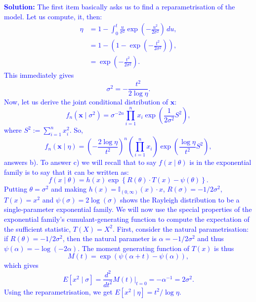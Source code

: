 \documentclass[a4paper,10pt, notitlepage]{report}
\begin{document}
\textcolor{blue}{
\textbf{Solution:}
The first item basically asks us to find a reparametrisation of the model.
Let us compute, it, then:
\begin{align*}
 \eta &= 1 - \int_0^t \frac{u}{\sigma^2} \exp\left(-\frac{u^2}{2\sigma^2}\right)\,du,\\
 &= 1 -\left(1- \exp\left(-\frac{t^2}{2\sigma^2}\right)\right),\\
 &= \exp\left(-\frac{t^2}{2\sigma^2}\right).
\end{align*}
This immediately gives
$$\sigma^2 = -\frac{t^2}{2\log\eta}.$$
Now, let us derive the joint conditional distribution of $\boldsymbol{x}$:
\begin{equation*}
 f_n(\boldsymbol{x} \mid \sigma^2) = \sigma^{-2n}\prod_{i=1}^n x_i \exp\left(\frac{1}{2\sigma^2}S^2\right), 
\end{equation*}
where $S^2 := \sum_{i=1}^n x_i^2$.
So,
\begin{equation}
\label{eq:likelihood_rayleigh}
 f_n(\boldsymbol{x} \mid \eta) = \left(-\frac{2\log\eta}{t^2}\right)^n\left(\prod_{i=1}^n x_i \right) \exp\left(\frac{\log\eta}{t^2}S^2\right),
\end{equation}
answers b).
To answer c) we will recall that to say $f(x\mid\theta)$ is in the exponential family is to say that it can be written as:
\begin{equation*}
 f(x \mid \theta) = h(x) \exp\left\{R(\theta)\cdot T(x) - \psi(\theta) \right\}.
\end{equation*}
Putting $\theta = \sigma^2$ and making $h(x) =  \mathbb{I}_{(0, \infty)}(x) \cdot x $, $R(\sigma) = -1/2\sigma^2$, $T(x) = x^2$ and $\psi(\sigma) = 2\log(\sigma)$ shows the Rayleigh distribution to be a single-parameter exponential family.
We will now use the special properties of the exponential family's cumulant-generating function to compute the expectation of the sufficient statistic, $T(X) = X^2$.
First, consider the natural parametrisation: if $R(\theta) = -1/2\sigma^2$, then the natural parameter is $\alpha = -1/2\sigma^2$ and thus $\psi(\alpha) = -\log(-2\alpha)$.
The moment generating function of $T(x)$ is thus
\begin{equation*}
 M(t) = \exp\left(\psi(\alpha + t) - \psi(\alpha) \right),
\end{equation*}
which gives
\begin{equation*} 
E[x^2 \mid \sigma] = \frac{d^2}{dt^2} M(t)\bigg\rvert_{t=0} = -\alpha^{-1} = 2\sigma^2.
\end{equation*}
Using the reparametrisation, we get $E[x^2 \mid \eta] = t^2/\log\eta$.
}
\end{document}
